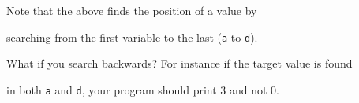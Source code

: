 Note that the above finds the position of a value by

searching from the first variable to the last (\texttt{a} to \texttt{d}).

What if you search backwards? For instance if the target value is found

in both \texttt{a} and \texttt{d}, your program should print 3 and not 0.

